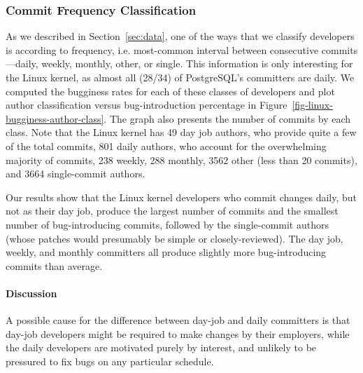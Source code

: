 \subsubsection{Commit Frequency Classification} 

As we described in Section~\ref{sec:data}, one of the ways that we classify
developers is according to frequency, i.e. most-common interval between
consecutive commits---daily, weekly, monthly, other, or single.  This
information is only interesting for the Linux kernel, as almost all (28/34) of
PostgreSQL's committers are daily. We computed the bugginess rates for each of
these classes of developers and plot author classification versus
bug-introduction percentage in
Figure~\ref{fig-linux-bugginess-author-class}. The graph also presents the
number of commits by each class. Note that the Linux kernel has 49 day job
authors, who provide quite a few of the total commits, 801 daily authors, who
account for the overwhelming majority of commits, 238 weekly, 288 monthly, 3562
other (less than 20 commits), and 3664 single-commit authors.

Our results show that the Linux kernel developers who commit changes daily, but
not as their day job, produce the largest number of commits and the smallest
number of bug-introducing commits, followed by the single-commit authors (whose
patches would presumably be simple or closely-reviewed). The day job, weekly,
and monthly committers all produce slightly more bug-introducing commits than
average.

\paragraph{Discussion}

A possible cause for the difference between day-job and daily committers is that
day-job developers might be required to make changes by their employers, while
the daily developers are motivated purely by interest, and unlikely to be
pressured to fix bugs on any particular schedule.

